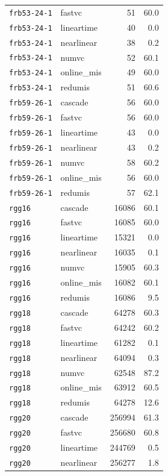\begin{longtable}{l l r r}
\texttt{frb53-24-1} & fastvc & 51 & 60.0 \\
\texttt{frb53-24-1} & lineartime & 40 & 0.0 \\
\texttt{frb53-24-1} & nearlinear & 38 & 0.2 \\
\texttt{frb53-24-1} & numvc & 52 & 60.1 \\
\texttt{frb53-24-1} & online\_mis & 49 & 60.0 \\
\texttt{frb53-24-1} & redumis & 51 & 60.6 \\
\texttt{frb59-26-1} & cascade & 56 & 60.0 \\
\texttt{frb59-26-1} & fastvc & 56 & 60.0 \\
\texttt{frb59-26-1} & lineartime & 43 & 0.0 \\
\texttt{frb59-26-1} & nearlinear & 43 & 0.2 \\
\texttt{frb59-26-1} & numvc & 58 & 60.2 \\
\texttt{frb59-26-1} & online\_mis & 56 & 60.0 \\
\texttt{frb59-26-1} & redumis & 57 & 62.1 \\
\texttt{rgg16} & cascade & 16086 & 60.1 \\
\texttt{rgg16} & fastvc & 16085 & 60.0 \\
\texttt{rgg16} & lineartime & 15321 & 0.0 \\
\texttt{rgg16} & nearlinear & 16035 & 0.1 \\
\texttt{rgg16} & numvc & 15905 & 60.3 \\
\texttt{rgg16} & online\_mis & 16082 & 60.1 \\
\texttt{rgg16} & redumis & 16086 & 9.5 \\
\texttt{rgg18} & cascade & 64278 & 60.3 \\
\texttt{rgg18} & fastvc & 64242 & 60.2 \\
\texttt{rgg18} & lineartime & 61282 & 0.1 \\
\texttt{rgg18} & nearlinear & 64094 & 0.3 \\
\texttt{rgg18} & numvc & 62548 & 87.2 \\
\texttt{rgg18} & online\_mis & 63912 & 60.5 \\
\texttt{rgg18} & redumis & 64278 & 12.6 \\
\texttt{rgg20} & cascade & 256994 & 61.3 \\
\texttt{rgg20} & fastvc & 256680 & 60.8 \\
\texttt{rgg20} & lineartime & 244769 & 0.5 \\
\texttt{rgg20} & nearlinear & 256277 & 1.8 \\

\end{longtable}
